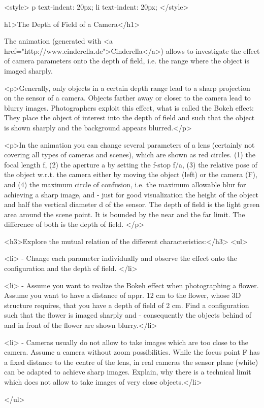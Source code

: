 <style>
p {
  text-indent: 20px;
}
li {
  text-indent: 20px;
}
</style>

h1>The Depth of Field of a Camera</h1> 
  
 The animation (generated with <a
    href="http://www.cinderella.de">Cinderella</a>) 
    allows to investigate the effect of camera parameters onto the depth of field, i.e. the range where the object is imaged sharply. 
    
    <p>Generally, only objects in a certain depth range lead to a sharp projection on the sensor of a camera. Objects farther away or closer to the camera lead to blurry images. Photographers exploit this effect, what is called the Bokeh effect: They place the object of interest into the depth of field and such that the object is shown sharply and the background appears blurred.</p>
    
    
    
    <p>In the animation you can change several parameters of a lens (certainly not covering all types of cameras and scenes), which are shown as red circles.  (1) the focal length f, (2) the aperture a by setting the f-stop f/a, (3) the relative pose of the object w.r.t. the camera either by moving the object (left) or the camera (F), and (4) the maximum circle of confusion, i.e. the maximum allowable blur for achieving a sharp image, and - just for good visualization the height of the object and half the vertical diameter d of the sensor. The depth of field is the light green area around the scene point. It is bounded by the near and the far limit. The difference of both is the depth of field. </p>
     
    
    
    
    
    <h3>Explore the mutual relation of the different characteristics:</h3>
    <ul>
    
    <li> - Change each parameter individually and observe the effect onto the configuration and the depth of field. 
		</li>
       
    <li> - Assume you want to realize the Bokeh effect when photographing a flower. Assume you want to have a distance of appr. 12 cm to the flower, whose 3D structure requires, that you have a depth of field of 2 cm. Find a configuration such that the flower is imaged sharply and - consequently the objects behind of and in front of the flower are shown blurry.</li>
    
    <li> - Cameras usually do not allow to take images which are too close to the camera. Assume a camera without zoom possibilities. While the focus point F has a fixed distance to the centre of the lens, in real cameras the sensor plane (white) can be adapted to achieve sharp images. Explain, why there is a technical limit which does not allow to take images of very close objects.</li>
     
    </ul>
